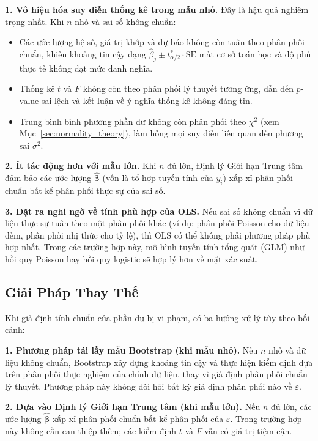 \documentclass[12pt, a4paper]{article}
\begin{document}
\textbf{1. Vô hiệu hóa suy diễn thống kê trong mẫu nhỏ.} Đây là hậu quả nghiêm trọng nhất. Khi $n$ nhỏ và sai số không chuẩn:
\begin{itemize}
  \item Các ước lượng hệ số, giá trị khớp và dự báo không còn tuân theo phân phối chuẩn, khiến khoảng tin cậy dạng $\hat{\beta}_j \pm t^*_{\alpha/2} \cdot \mathrm{SE}$ mất cơ sở toán học và độ phủ thực tế không đạt mức danh nghĩa.
  \item Thống kê $t$ và $F$ không còn theo phân phối lý thuyết tương ứng, dẫn đến $p$-value sai lệch và kết luận về ý nghĩa thống kê không đáng tin.
  \item Trung bình bình phương phần dư không còn phân phối theo $\chi^2$ (xem Mục~\ref{sec:normality_theory}), làm hỏng mọi suy diễn liên quan đến phương sai $\sigma^2$.
\end{itemize}

\textbf{2. Ít tác động hơn với mẫu lớn.} Khi $n$ đủ lớn, Định lý Giới hạn Trung tâm đảm bảo các ước lượng $\hat{\boldsymbol{\beta}}$ (vốn là tổ hợp tuyến tính của $y_i$) xấp xỉ phân phối chuẩn bất kể phân phối thực sự của sai số.

\textbf{3. Đặt ra nghi ngờ về tính phù hợp của OLS.} Nếu sai số không chuẩn vì dữ liệu thực sự tuân theo một phân phối khác (ví dụ: phân phối Poisson cho dữ liệu đếm, phân phối nhị thức cho tỷ lệ), thì OLS có thể không phải phương pháp phù hợp nhất. Trong các trường hợp này, mô hình tuyến tính tổng quát (GLM) như hồi quy Poisson hay hồi quy logistic sẽ hợp lý hơn về mặt xác suất.

\subsection{Giải Pháp Thay Thế}

Khi giả định tính chuẩn của phần dư bị vi phạm, có ba hướng xử lý tùy theo bối cảnh:

\textbf{1. Phương pháp tái lấy mẫu Bootstrap (khi mẫu nhỏ).} Nếu $n$ nhỏ và dữ liệu không chuẩn, Bootstrap xây dựng khoảng tin cậy và thực hiện kiểm định dựa trên phân phối thực nghiệm của chính dữ liệu, thay vì giả định phân phối chuẩn lý thuyết. Phương pháp này không đòi hỏi bất kỳ giả định phân phối nào về $\varepsilon$.

\textbf{2. Dựa vào Định lý Giới hạn Trung tâm (khi mẫu lớn).} Nếu $n$ đủ lớn, các ước lượng $\hat{\boldsymbol{\beta}}$ xấp xỉ phân phối chuẩn bất kể phân phối của $\varepsilon$. Trong trường hợp này không cần can thiệp thêm; các kiểm định $t$ và $F$ vẫn có giá trị tiệm cận.
\end{document}
